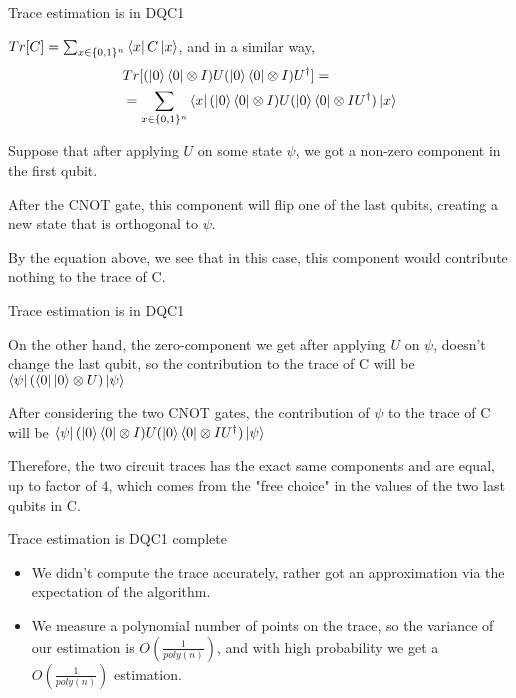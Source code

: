 \documentclass[leqno,fleqn]{beamer}
\begin{document}
\begin{frame}[label=sec-2-4]{Trace estimation is in DQC1}
\begin{block}{}
\(Tr[C] = \sum_{x \in \{0,1\}^n} \bra{x}C\ket{x}\), and in a similar way,
\begin{align*}
&Tr[(\ket{0}\bra{0} \otimes I)U(\ket{0}\bra{0} \otimes I)U^\dagger] = \\
&= \sum_{x \in \{0,1\}^n} \bra{x}(\ket{0}\bra{0}\otimes I)U(\ket{0}\bra{0}\otimes I{U^\dagger})\ket{x}
\end{align*}
\end{block}
\begin{block}{}
Suppose that after applying \(U\) on some state \(\psi\), we got a non-zero component in the first qubit.
\end{block}
\begin{block}{}
After the CNOT gate, this component will flip one of the last qubits, creating a new state that is orthogonal to \(\psi\).
\end{block}
\begin{block}{}
By the equation above, we see that in this case, this component would contribute nothing to the trace of C.
\end{block}
\end{frame}
\begin{frame}[label=sec-2-5]{Trace estimation is in DQC1}
\begin{block}{}
On the other hand, the zero-component we get after applying \(U\) on \(\psi\), doesn't change the last qubit, so the contribution to the trace of C will be \(\bra{\psi}(\bra{0}\ket{0} \otimes U)\ket{\psi}\)
\end{block}
\begin{block}{}
After considering the two CNOT gates, the contribution of \(\psi\) to the trace of C will be \(\bra{\psi}(\ket{0}\bra{0}\otimes I)U(\ket{0}\bra{0}\otimes I{U^\dagger})\ket{\psi}\)
\end{block}
\begin{block}{}
Therefore, the two circuit traces has the exact same components and are equal, up to factor of 4, which comes from the "free choice" in the values of the two last qubits in C.
\end{block}
\end{frame}
\begin{frame}[label=sec-2-6]{Trace estimation is DQC1 complete}
\begin{itemize}
\item We didn't compute the trace accurately, rather got an approximation via the expectation of the algorithm.
\item We measure a polynomial number of points on the trace, so the variance of our estimation is \(O(\frac{1}{poly(n)})\), and with high probability we get a  \(O(\frac{1}{poly(n)})\) estimation.
\end{itemize}
\end{frame}
\end{document}
